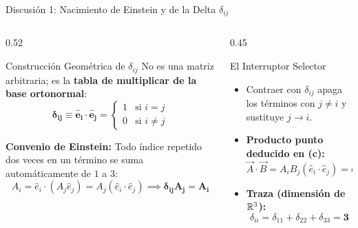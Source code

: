 \documentclass[10pt,aspectratio=169]{beamer}
\begin{document}
\begin{frame}{Discusión 1: Nacimiento de Einstein y de la Delta $\delta_{ij}$}
  \begin{columns}[c]
    \begin{column}{0.52\textwidth}
      \begin{block}{Construcción Geométrica de $\delta_{ij}$}
        No es una matriz arbitraria; es la \textbf{tabla de multiplicar de la base ortonormal}:
        \[
        \mathbf{\delta_{ij} \equiv \hat{e}_i \cdot \hat{e}_j} = \begin{cases} 1 & \text{si } i = j \\ 0 & \text{si } i \neq j \end{cases}
        \]
      \end{block}
      \small
      \textbf{Convenio de Einstein:} Todo índice repetido dos veces en un término se suma automáticamente de $1$ a $3$:
      \[
      A_i = \hat{e}_i \cdot (A_j\hat{e}_j) = A_j(\hat{e}_i\cdot\hat{e}_j) \implies \mathbf{\delta_{ij} A_j = A_i}
      \]
    \end{column}
    \begin{column}{0.45\textwidth}
      \begin{exampleblock}{El Interruptor Selector}
        \small
        \begin{itemize}
          \item Contraer con $\delta_{ij}$ apaga los términos con $j \neq i$ y sustituye $j \to i$.
          \item \textbf{Producto punto deducido en (c):}
          \[
          \vec{A}\cdot\vec{B} = A_i B_j (\hat{e}_i\cdot\hat{e}_j) = \delta_{ij} A_i B_j = \mathbf{A_i B_i}
          \]
          \item \textbf{Traza (dimensión de $\mathbb{R}^3$):}
          \[
          \delta_{ii} = \delta_{11} + \delta_{22} + \delta_{33} = \mathbf{3}
          \]
        \end{itemize}
      \end{exampleblock}
    \end{column}
  \end{columns}
\end{frame}
\end{document}
